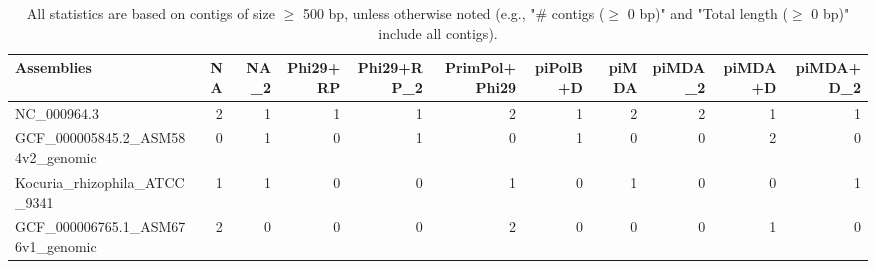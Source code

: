 \documentclass[12pt,a4paper]{article}
\begin{document}
\begin{table}[ht]
\begin{center}
\caption{All statistics are based on contigs of size $\geq$ 500 bp, unless otherwise noted (e.g., "\# contigs ($\geq$ 0 bp)" and "Total length ($\geq$ 0 bp)" include all contigs).}
\begin{tabular}{|l*{10}{|r}|}
\hline
Assemblies & NA & NA\_2 & Phi29+RP & Phi29+RP\_2 & PrimPol+Phi29 & piPolB+D & piMDA & piMDA\_2 & piMDA+D & piMDA+D\_2 \\ \hline
NC\_000964.3 & 2 & 1 & 1 & 1 & 2 & 1 & 2 & 2 & 1 & 1 \\ \hline
GCF\_000005845.2\_ASM584v2\_genomic & 0 & 1 & 0 & 1 & 0 & 1 & 0 & 0 & 2 & 0 \\ \hline
Kocuria\_rhizophila\_ATCC\_9341 & 1 & 1 & 0 & 0 & 1 & 0 & 1 & 0 & 0 & 1 \\ \hline
GCF\_000006765.1\_ASM676v1\_genomic & 2 & 0 & 0 & 0 & 2 & 0 & 0 & 0 & 1 & 0 \\ \hline
\end{tabular}
\end{center}
\end{table}
\end{document}

